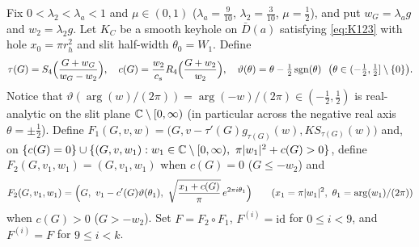 Fix $0<\lambda_2<\lambda_a<1$ and $\mu\in(0,1)$ ($\lambda_a=\frac9{10}$, $\lambda_2=\frac3{10}$, $\mu=\frac12$), and
put $w_G=\lambda_a g$ and $w_2=\lambda_2 g$. Let $K_C$ be a smooth keyhole on $\bar D(a)$ satisfying \eqref{eq:K123}
with hole $x_0=\pi r_h^2$ and slit half-width $\theta_0=W_1$. Define
\[
 \tau(G)=S_4\Bigl(\frac{G+w_G}{w_G-w_2}\Bigr),\quad
 c(G)=\frac{w_2}{c_s}R_4\Bigl(\frac{G+w_2}{w_2}\Bigr),\quad
 \vartheta(\theta)=\theta-\tfrac12\sgn(\theta)\ \ \bigl(\theta\in(-\tfrac12,\tfrac12]\setminus\{0\}\bigr).
\]
Notice that $\vartheta(\arg(w)/(2\pi))=\arg(-w)/(2\pi)\in(-\frac12,\frac12)$ is real-analytic on the slit plane
$\mathbb{C}\setminus[0,\infty)$ (in particular across the negative real axis $\theta=\pm\frac12$). Define $F_1(G,v,w)=\bigl(G,v-\tau'(G)g_{\tau(G)}(w),KS_{\tau(G)}(w)\bigr)$ and, on $\{c(G)=0\}\cup\{(G,v,w_1):w_1\in\C\setminus[0,\infty),\ \pi|w_1|^2+c(G)>0\}$, define $F_2(G,v_1,w_1)=(G,v_1,w_1)$ when $c(G)=0$ ($G\le-w_2$) and
\[
 F_2(G,v_1,w_1)=\Bigl(G,\ v_1-c'(G)\vartheta(\theta_1),\ \sqrt{\frac{x_1+c(G)}{\pi}}\,e^{2\pi i\theta_1}\Bigr)
 \qquad(x_1=\pi|w_1|^2,\ \theta_1=\arg(w_1)/(2\pi))
\]
when $c(G)>0$ ($G>-w_2$). Set $F=F_2\circ F_1$, $F^{(i)}=\mathrm{id}$ for $0\le i<9$, and $F^{(i)}=F$ for $9\le i<k$.


